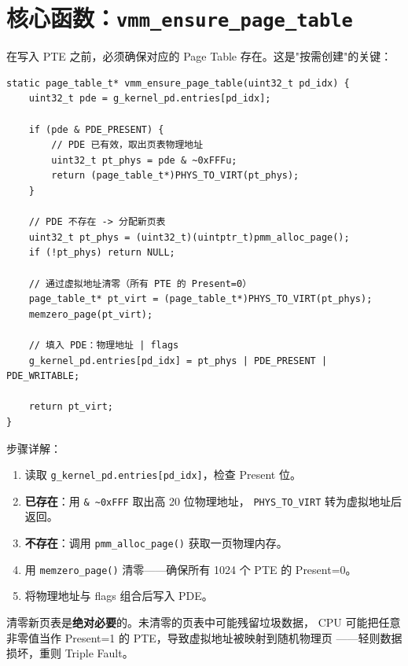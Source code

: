 \section{核心函数：\texttt{vmm\_ensure\_page\_table}}

在写入 PTE 之前，必须确保对应的 Page Table 存在。这是"按需创建"的关键：

\begin{lstlisting}[style=cstyle]
static page_table_t* vmm_ensure_page_table(uint32_t pd_idx) {
    uint32_t pde = g_kernel_pd.entries[pd_idx];

    if (pde & PDE_PRESENT) {
        // PDE 已有效，取出页表物理地址
        uint32_t pt_phys = pde & ~0xFFFu;
        return (page_table_t*)PHYS_TO_VIRT(pt_phys);
    }

    // PDE 不存在 -> 分配新页表
    uint32_t pt_phys = (uint32_t)(uintptr_t)pmm_alloc_page();
    if (!pt_phys) return NULL;

    // 通过虚拟地址清零（所有 PTE 的 Present=0）
    page_table_t* pt_virt = (page_table_t*)PHYS_TO_VIRT(pt_phys);
    memzero_page(pt_virt);

    // 填入 PDE：物理地址 | flags
    g_kernel_pd.entries[pd_idx] = pt_phys | PDE_PRESENT | PDE_WRITABLE;

    return pt_virt;
}
\end{lstlisting}

步骤详解：

\begin{enumerate}
  \item 读取 \texttt{g\_kernel\_pd.entries[pd\_idx]}，检查 Present 位。
  \item \textbf{已存在}：用 \texttt{\& \textasciitilde 0xFFF} 取出高 20 位物理地址，
        \texttt{PHYS\_TO\_VIRT} 转为虚拟地址后返回。
  \item \textbf{不存在}：调用 \texttt{pmm\_alloc\_page()} 获取一页物理内存。
  \item 用 \texttt{memzero\_page()} 清零——确保所有 1024 个 PTE 的 Present=0。
  \item 将物理地址与 flags 组合后写入 PDE。
\end{enumerate}

\begin{warnbox}
清零新页表是\textbf{绝对必要}的。未清零的页表中可能残留垃圾数据，
CPU 可能把任意非零值当作 Present=1 的 PTE，导致虚拟地址被映射到随机物理页
——轻则数据损坏，重则 Triple Fault。
\end{warnbox}


